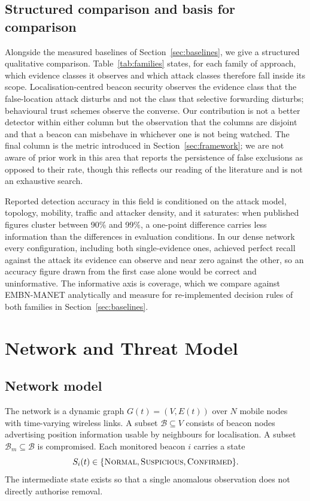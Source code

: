 \documentclass[pdflatex,sn-mathphys-num]{sn-jnl}%
\theoremstyle{thmstyleone}%
\theoremstyle{thmstyletwo}%
\theoremstyle{thmstylethree}%
\begin{document}
\subsection{Structured comparison and basis for comparison}

Alongside the measured baselines of Section~\ref{sec:baselines}, we give a
structured qualitative comparison. Table~\ref{tab:families} states, for each family of
approach, which evidence classes it observes and which attack classes
therefore fall inside its scope. Localisation-centred beacon security
observes the evidence class that the false-location attack disturbs and not
the class that selective forwarding disturbs; behavioural trust schemes
observe the converse. Our contribution is not a better detector within
either column but the observation that the columns are disjoint and that a
beacon can misbehave in whichever one is not being watched. The final column
is the metric introduced in Section~\ref{sec:framework}; we are not aware of
prior work in this area that reports the persistence of false exclusions
as opposed to their rate, though this reflects our reading of the literature
and is not an exhaustive search.

Reported detection accuracy in this field is conditioned on the attack model,
topology, mobility, traffic and attacker density, and it saturates: when
published figures cluster between 90\% and 99\%, a one-point difference
carries less information than the differences in evaluation conditions. In
our dense network every configuration, including both single-evidence ones,
achieved perfect recall against the attack its evidence can observe and near
zero against the other, so an accuracy figure drawn from the first case alone
would be correct and uninformative. The informative axis is coverage, which we
compare against EMBN-MANET analytically and measure for re-implemented
decision rules of both families in Section~\ref{sec:baselines}.

\section{Network and Threat Model}
\label{sec:model}

\subsection{Network model}

The network is a dynamic graph $G(t) = (V, E(t))$ over $N$ mobile nodes with
time-varying wireless links. A subset $\mathcal{B} \subseteq V$ consists of beacon
nodes advertising position information usable by neighbours for
localisation. A subset $\mathcal{B}_m \subseteq \mathcal{B}$ is compromised.
Each monitored beacon $i$ carries a state
\begin{equation}
\label{eq:state}
S_i(t) \in \{\textsc{Normal}, \textsc{Suspicious}, \textsc{Confirmed}\}.
\end{equation}
The intermediate state exists so that a single anomalous observation does
not directly authorise removal.
\end{document}
